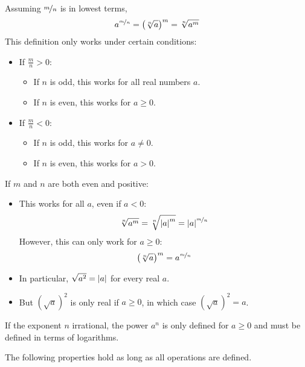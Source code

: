 Assuming $\nicefrac{m}{n}$ is in lowest terms,
\begin{equation*}
   a^{\nicefrac{m}{n}}
   = \left(\sqrt[n]{a}\right)^m
   = \sqrt[n]{a^m}
\end{equation*}
This definition only works under certain conditions:
\begin{itemize}
\item If $\frac{m}{n} > 0$:
 \begin{itemize}
 \item If $n$ is odd, this works for all real numbers $a$.
 \item If $n$ is even, this works for $a \geq 0$.
 \end{itemize}
\item If $\frac{m}{n} < 0$:
 \begin{itemize}
 \item If $n$ is odd, this works for $a \neq 0$.
 \item If $n$ is even, this works for $a > 0$.
 \end{itemize}
\end{itemize}


If $m$ and $n$ are both even and positive:
\begin{itemize}
\item This works for all $a$, even if $a < 0$:
 \begin{equation*}
  \sqrt[n]{a^m} = \sqrt[n]{\left\lvert a\right\rvert^m} = \left\lvert a\right\rvert^{\nicefrac{m}{n}}
 \end{equation*}
 However, this can only work for $a \geq 0$:
 \begin{equation*}
  \left(\sqrt[n]{a}\right)^m = a^{\nicefrac{m}{n}}
 \end{equation*}
\item In particular, $\sqrt{a^2} = \left\lvert a\right\rvert$ for every real $a$.
\item But $(\sqrt{a})^2$ is only real if $a \geq 0$, in which case $(\sqrt{a})^2 = a$.
\end{itemize}

If the exponent $n$ irrational, the power $a^n$ is only defined for $a \geq 0$ and must be defined in terms of logarithms.


The following properties hold as long as all operations are defined.

